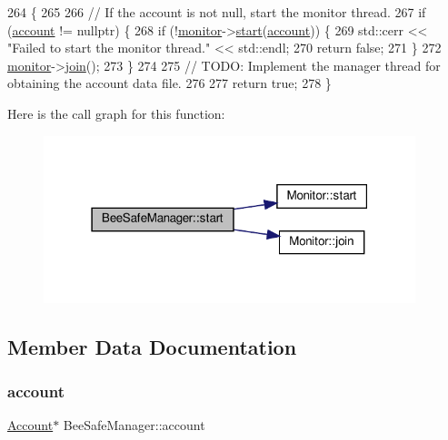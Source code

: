 \begin{DoxyCode}
264 \{
265 
266     \textcolor{comment}{// If the account is not null, start the monitor thread.}
267     \textcolor{keywordflow}{if} (\hyperlink{class_bee_safe_manager_a52bc9bc8c1ea9608b83d603b142443b0}{account} != \textcolor{keyword}{nullptr}) \{
268         \textcolor{keywordflow}{if} (!\hyperlink{class_bee_safe_manager_a3b885b4fb364228c914095f2e670f9af}{monitor}->\hyperlink{class_monitor_a71dfa92dfa25ee137f4e3d5e01a8d673}{start}(\hyperlink{class_bee_safe_manager_a52bc9bc8c1ea9608b83d603b142443b0}{account})) \{
269             std::cerr << \textcolor{stringliteral}{"Failed to start the monitor thread."} << std::endl;
270             \textcolor{keywordflow}{return} \textcolor{keyword}{false};
271         \}
272         \hyperlink{class_bee_safe_manager_a3b885b4fb364228c914095f2e670f9af}{monitor}->\hyperlink{class_monitor_a2d2e309666c98333a317c9786f94f6ad}{join}();
273     \}
274 
275     \textcolor{comment}{// TODO: Implement the manager thread for obtaining the account data file.}
276 
277     \textcolor{keywordflow}{return} \textcolor{keyword}{true};
278 \}
\end{DoxyCode}
Here is the call graph for this function\+:\nopagebreak
\begin{figure}[H]
\begin{center}
\leavevmode
\includegraphics[width=307pt]{d5/d75/class_bee_safe_manager_a7242d89761621de0e09ec9ea360fca27_cgraph}
\end{center}
\end{figure}


\subsection{Member Data Documentation}
\mbox{\label{class_bee_safe_manager_a52bc9bc8c1ea9608b83d603b142443b0}} 
\subsubsection{\texorpdfstring{account}{account}}
{\footnotesize\ttfamily \hyperlink{class_account}{Account}$\ast$ Bee\+Safe\+Manager\+::account\hspace{0.3cm}{\ttfamily [private]}}



